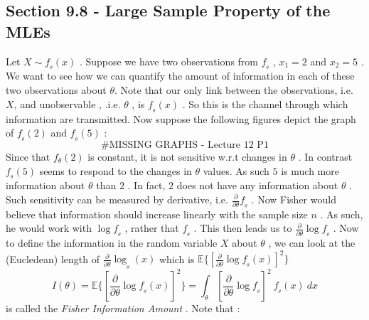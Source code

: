 \documentclass[14pt,twoside,a4paper,fleqn]{article}
\theoremstyle{plain}
\begin{document}
\subsection{Section 9.8 - Large Sample Property of the MLEs}
Let $X\sim f_{_\theta}(x)$ . Suppose we have two observations from $f_{_\theta}$ , $x_1 = 2$ and $x_2 = 5$ . We want to see how we can quantify the amount of information in each of these two observations about $\theta$. Note that our only link between the observations, i.e. $X$, and unobservable , .i.e. $\theta$ , is $f_{_\theta}(x)$ . So this is the channel through which information are transmitted. Now suppose the following figures depict the graph of $f_{_\theta}(2)$ and $f_{_\theta}(5)$ :
$$
\text{\#MISSING GRAPHS - Lecture 12 P1}
$$
 Since that $f_{\theta}(2)$ is constant, it is not sensitive w.r.t changes in $\theta$ . In contrast $f_{_\theta}(5)$ seems to respond to the changes in $\theta$ values. As such $5$ is much more information about $\theta$ than $2$ . In fact, $2$ does not have any information about $\theta$ . Such sensitivity can be measured by derivative, i.e. $\frac{\partial}{\partial\theta}f_{_\theta}$ . Now Fisher would  believe that information should increase linearly with the sample size $n$ . As such, he would work with $\log f_{_\theta}$ , rather that $f_{_\theta}$ . This then leads us to $\frac{\partial}{\partial\theta}\log f_{_\theta}$ . Now to define the information in the random variable $X$ about $\theta$ , we can look at the (Eucledean) length of \mbox{$\frac{\partial}{\partial\theta}\log_{_\theta}(x)$} which is $\mathbb{E}\big\{[\frac{\partial}{\partial\theta}\log f_{_\theta}(x)]^2\big\}$
$$
	I(\theta) = \mathbb{E}\big\{[\frac{\partial}{\partial\theta}\log f_{_\theta}(x)]^2\big\} = \int_{\theta}[\frac{\partial}{\partial\theta}\log f_{_\theta}]^2\ f_{_\theta}(x)\ dx
$$ 
is called the \emph{Fisher Information Amount} . Note that :
\end{document}
